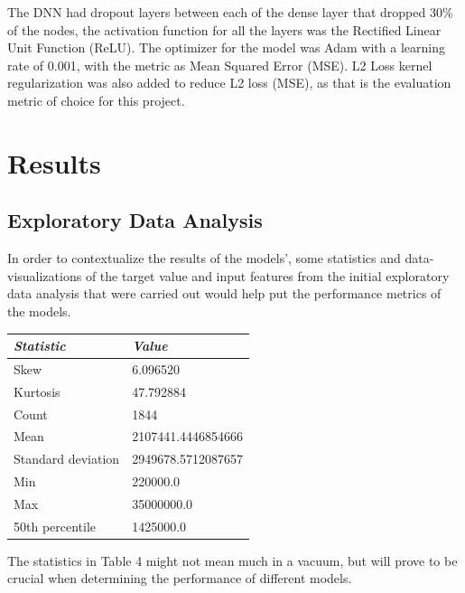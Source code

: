 \documentclass[conference]{IEEEtran}
\begin{document}
The DNN had dropout layers between each of the dense layer that dropped 30\% of the nodes, the activation function for all the layers was the Rectified Linear Unit Function (ReLU). The optimizer for the model was Adam with a learning rate of 0.001, with the metric as Mean Squared Error (MSE). L2 Loss kernel regularization was also added to reduce L2 loss (MSE), as that is the evaluation metric of choice for this project.
\section{Results}

\subsection{Exploratory Data Analysis}

In order to contextualize the results of the models', some statistics and data-visualizations of the target value and input features from the initial exploratory data analysis that were carried out would help put the performance metrics of the models.
\smallbreak
\smallbreak
\smallbreak
\footnotesize
\begin{tabular}{|l|l|}
\hline
\textit{\textbf{Statistic}} & \textit{\textbf{Value}}                    \\ \hline
Skew                        & 6.096520           \\ \hline
Kurtosis                    & 47.792884          \\ \hline
Count                       & 1844               \\ \hline
Mean                        & 2107441.4446854666 \\ \hline
Standard   deviation        & 2949678.5712087657 \\ \hline
Min                         & 220000.0           \\ \hline
Max                         & 35000000.0         \\ \hline
50th   percentile           & 1425000.0                                  \\ \hline
\end{tabular}
\smallbreak
{}
\smallbreak
\normalsize

The statistics in Table 4 might not mean much in a vacuum, but will prove to be crucial when determining the performance of different models.
\end{document}
